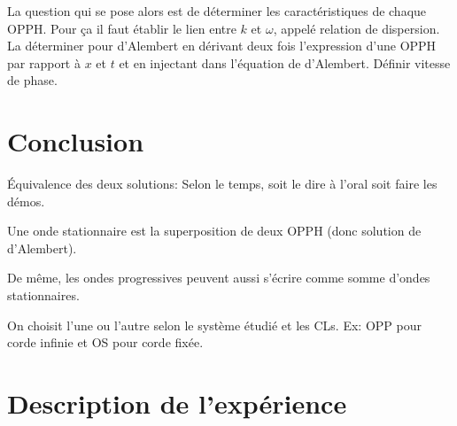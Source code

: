 \documentclass[11pt]{report}
\numberwithin{figure}{section}
\numberwithin{equation}{section}
\numberwithin{table}{section}
\newcommand{\1}{\boldsymbol{1}}
\begin{document}
La question qui se pose alors est de déterminer les caractéristiques  de chaque OPPH. Pour ça il faut établir le lien entre $k$ et $\omega$, appelé relation de dispersion. La déterminer pour d'Alembert en dérivant deux fois l'expression d'une OPPH par rapport à $x$ et $t$ et en injectant dans l'équation de d'Alembert. Définir vitesse de phase.



\section*{Conclusion}

Équivalence des deux solutions: \textcolor{mycolor5}{Selon le temps, soit le dire à l'oral soit faire les démos.}

Une onde stationnaire est la superposition de deux OPPH (donc solution de d'Alembert). 

De même, les ondes progressives peuvent aussi s'écrire comme somme d'ondes stationnaires.

On choisit l'une ou l'autre selon le système étudié et les CLs. Ex: OPP pour corde infinie et OS pour corde fixée.
  
\section*{Description de l'expérience}
\end{document}
